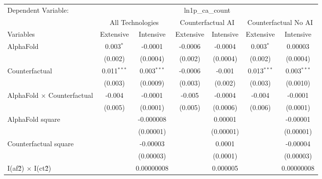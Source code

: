 \begingroup
\centering
\begin{tabular}{lcccccc}
   \tabularnewline \midrule \midrule
   Dependent Variable: & \multicolumn{6}{c}{ln1p\_ca\_count}\\
 & \multicolumn{2}{c}{All Technologies} & \multicolumn{2}{c}{Counterfactual AI} & \multicolumn{2}{c}{Counterfactual No AI} \\
\cmidrule(lr){1-1}\cmidrule(lr){2-3} \cmidrule(lr){4-5} \cmidrule(lr){6-7}
Variables & \multicolumn{1}{c}{Extensive} & \multicolumn{1}{c}{Intensive} & \multicolumn{1}{c}{Extensive} & \multicolumn{1}{c}{Intensive} & \multicolumn{1}{c}{Extensive} & \multicolumn{1}{c}{Intensive} \\
\cmidrule(lr){1-1}\cmidrule(lr){2-2} \cmidrule(lr){3-3} \cmidrule(lr){4-4} \cmidrule(lr){5-5} \cmidrule(lr){6-6} \cmidrule(lr){7-7}
   AlphaFold                          & 0.003$^{*}$   & -0.0001       & -0.0006 & -0.0004    & 0.003$^{*}$   & 0.00003\\   
                                      & (0.002)       & (0.0004)      & (0.002) & (0.0004)   & (0.002)       & (0.0004)\\   
   Counterfactual                     & 0.011$^{***}$ & 0.003$^{***}$ & -0.0006 & -0.001     & 0.013$^{***}$ & 0.003$^{***}$\\   
                                      & (0.003)       & (0.0009)      & (0.003) & (0.002)    & (0.003)       & (0.0010)\\   
   AlphaFold $\times$ Counterfactual  & -0.004        & -0.0001       & -0.005  & -0.0004    & -0.004        & -0.0001\\   
                                      & (0.005)       & (0.0001)      & (0.005) & (0.0006)   & (0.006)       & (0.0001)\\   
   AlphaFold square                   &               & -0.000008     &         & 0.00001    &               & -0.00001\\   
                                      &               & (0.00001)     &         & (0.00001)  &               & (0.00001)\\   
   Counterfactual square              &               & -0.00003      &         & 0.0001     &               & -0.00004\\   
                                      &               & (0.00003)     &         & (0.0001)   &               & (0.00003)\\   
   I(af\^2) $\times$ I(ct\^2)         &               & 0.00000008    &         & 0.000005   &               & 0.00000008\\   

\end{tabular}
